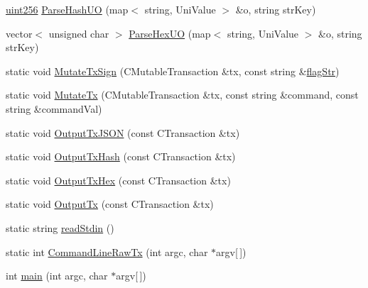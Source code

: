 \begin{DoxyCompactItemize}
\item 
\mbox{\hyperlink{classuint256}{uint256}} \mbox{\hyperlink{bitcoin-tx_8cpp_a7f5c8e5ec156f294d9334330e81611b9}{Parse\+Hash\+UO}} (map$<$ string, Uni\+Value $>$ \&o, string str\+Key)
\item 
vector$<$ unsigned char $>$ \mbox{\hyperlink{bitcoin-tx_8cpp_a305c1a70a88f39850f0ac9df9f45497b}{Parse\+Hex\+UO}} (map$<$ string, Uni\+Value $>$ \&o, string str\+Key)
\item 
static void \mbox{\hyperlink{bitcoin-tx_8cpp_a4530b9267f4e55a4dd36f329d42e9545}{Mutate\+Tx\+Sign}} (C\+Mutable\+Transaction \&tx, const string \&\mbox{\hyperlink{bitcoin-tx_8cpp_a4c63caa32881965b29b571644c25ef2a}{flag\+Str}})
\item 
static void \mbox{\hyperlink{bitcoin-tx_8cpp_ab7ebe37e92de4ef2ff4c3b547b1495c3}{Mutate\+Tx}} (C\+Mutable\+Transaction \&tx, const string \&command, const string \&command\+Val)
\item 
static void \mbox{\hyperlink{bitcoin-tx_8cpp_a26ba4dd080ca06548ff738ebbdf197d8}{Output\+Tx\+J\+S\+ON}} (const C\+Transaction \&tx)
\item 
static void \mbox{\hyperlink{bitcoin-tx_8cpp_a11e51019a89a249e5c1d0bdfb6a3025e}{Output\+Tx\+Hash}} (const C\+Transaction \&tx)
\item 
static void \mbox{\hyperlink{bitcoin-tx_8cpp_aa8ad9a2a3e50ac2b69b02c1dc5ff0e3e}{Output\+Tx\+Hex}} (const C\+Transaction \&tx)
\item 
static void \mbox{\hyperlink{bitcoin-tx_8cpp_afa9b1d8da4bf251e16a424daa3408335}{Output\+Tx}} (const C\+Transaction \&tx)
\item 
static string \mbox{\hyperlink{bitcoin-tx_8cpp_a3313aa342f7dfcab2383317d84373e65}{read\+Stdin}} ()
\item 
static int \mbox{\hyperlink{bitcoin-tx_8cpp_aa1edb2f1ad129a440e9c1f98d6a9e6bb}{Command\+Line\+Raw\+Tx}} (int argc, char $\ast$argv\mbox{[}$\,$\mbox{]})
\item 
int \mbox{\hyperlink{bitcoin-tx_8cpp_a0ddf1224851353fc92bfbff6f499fa97}{main}} (int argc, char $\ast$argv\mbox{[}$\,$\mbox{]})
\end{DoxyCompactItemize}
